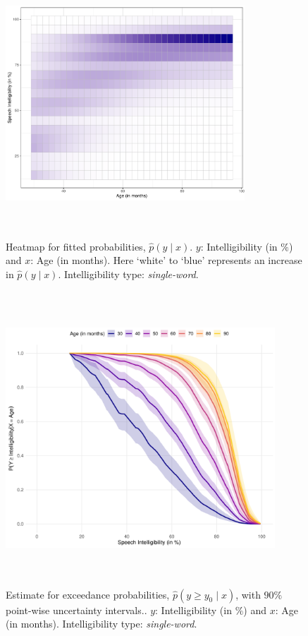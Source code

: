 \documentclass{article}[12pt]
\begin{document}
\begin{figure}[H]
    \centering
    \includegraphics[width = 0.8\textwidth, height = 10cm]{plots/heatmapRDS3SingleWord.pdf}
    \caption{Heatmap for fitted probabilities, $\widehat p(y \mid x)$. $y$: Intelligibility (in $\%$) and $x$: Age (in months). Here `white' to `blue' represents an increase in $\widehat p(y \mid x)$. Intelligibility type: \textit{single-word}.}
    \label{fig:2}
\end{figure}

\begin{figure}[H]
    \centering
    \includegraphics[width = 0.9\textwidth, height = 11cm]{plots/exceedanceRDS3SingleWord.pdf}
    \caption{Estimate for exceedance probabilities, $\widehat p(y \geq y_0 \mid x)$, with $90\%$ point-wise uncertainty intervals.. $y$: Intelligibility (in $\%$) and $x$: Age (in months). Intelligibility type: \textit{single-word}.}
    \label{fig:3}
\end{figure}
\end{document}
